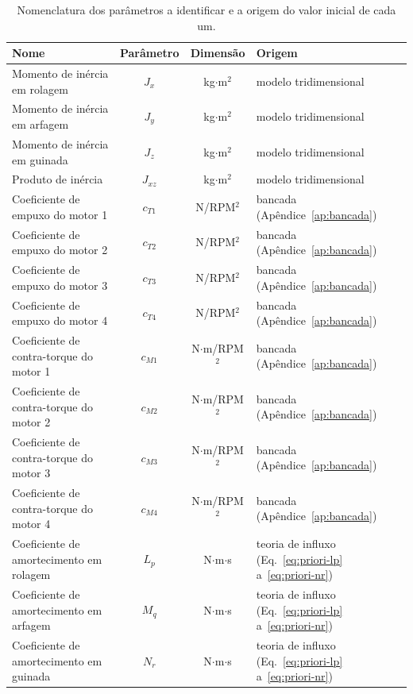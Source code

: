 {\begin{table}[H]
    \centering
    \caption{\color{blue}Nomenclatura dos parâmetros a identificar e a origem do valor inicial de cada um.}
    \label{tab:p0}
    \footnotesize\color{blue}
    \setlength{\tabcolsep}{5pt}
    \begin{tabular}{l c c l}
    \toprule
    Nome & Parâmetro & Dimensão & Origem \\
    \midrule
    Momento de inércia em rolagem           & $J_x$     & kg$\cdot$m$^2$    & modelo tridimensional \\
    Momento de inércia em arfagem           & $J_y$     & kg$\cdot$m$^2$    & modelo tridimensional \\
    Momento de inércia em guinada           & $J_z$     & kg$\cdot$m$^2$    & modelo tridimensional \\
    Produto de inércia                      & $J_{xz}$  & kg$\cdot$m$^2$    & modelo tridimensional \\
    Coeficiente de empuxo do motor 1        & $c_{T1}$ & N/RPM$^2$         & bancada (Apêndice~\ref{ap:bancada}) \\
    Coeficiente de empuxo do motor 2        & $c_{T2}$ & N/RPM$^2$         & bancada (Apêndice~\ref{ap:bancada}) \\
    Coeficiente de empuxo do motor 3        & $c_{T3}$ & N/RPM$^2$         & bancada (Apêndice~\ref{ap:bancada}) \\
    Coeficiente de empuxo do motor 4        & $c_{T4}$ & N/RPM$^2$         & bancada (Apêndice~\ref{ap:bancada}) \\
    Coeficiente de contra-torque do motor 1 & $c_{M1}$ & N$\cdot$m/RPM$^2$ & bancada (Apêndice~\ref{ap:bancada}) \\
    Coeficiente de contra-torque do motor 2 & $c_{M2}$ & N$\cdot$m/RPM$^2$ & bancada (Apêndice~\ref{ap:bancada}) \\
    Coeficiente de contra-torque do motor 3 & $c_{M3}$ & N$\cdot$m/RPM$^2$ & bancada (Apêndice~\ref{ap:bancada}) \\
    Coeficiente de contra-torque do motor 4 & $c_{M4}$ & N$\cdot$m/RPM$^2$ & bancada (Apêndice~\ref{ap:bancada}) \\
    Coeficiente de amortecimento em rolagem & $L_p$     & N$\cdot$m$\cdot$s & teoria de influxo (Eq.~\ref{eq:priori-lp} a~\ref{eq:priori-nr}) \\
    Coeficiente de amortecimento em arfagem & $M_q$     & N$\cdot$m$\cdot$s & teoria de influxo (Eq.~\ref{eq:priori-lp} a~\ref{eq:priori-nr}) \\
    Coeficiente de amortecimento em guinada & $N_r$     & N$\cdot$m$\cdot$s & teoria de influxo (Eq.~\ref{eq:priori-lp} a~\ref{eq:priori-nr}) \\
    \bottomrule
    \end{tabular}
\end{table}

}
